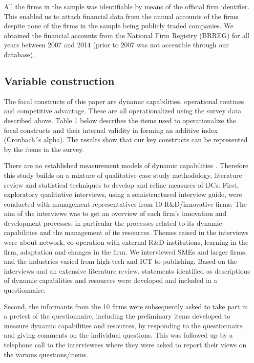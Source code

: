 \documentclass[review,fleqn]{elsarticle}\usepackage[]{graphicx}\usepackage[]{color}
\begin{document}
All the firms in the sample was identifiable by means of the official firm
identifier. This enabled us to attach financial data from the annual accounts of the firms
despite none of the firms in the sample being publicly traded companies. We obtained the
financial accounts from the National Firm Registry (BRREG) for all years between 2007 and
2014 (prior to 2007 was not accessible through our database).

\subsection{Variable construction}

The focal constructs of this paper are dynamic capabilities, operational routines and
competitive advantage. These are all operationalized using the survey data described
above. Table 1 below describes the items used to operationalize the focal constructs and
their internal validity in forming an additive index (Cronbach´s alpha). The results show
that our key constructs can be represented by the items in the survey.


There are no established measurement models of dynamic capabilities
\citep{McKelvie2009,Schilke2018}. Therefore this study builds on a mixture of qualitative
case study methodology, literature review and statistical techniques to develop and refine
measures of DCs. First, exploratory qualitative interviews, using a semistructured
interview guide, were conducted with management representatives from 10 R\&D/innovative
firms. The aim of the interviews was to get an overview of each firm's innovation and
development processes, in particular the processes related to its dynamic capabilities and
the management of its resources. Themes raised in the interviews were about network,
co-operation with external R\&D-institutions, learning in the firm, adaptation and changes
in the firm. We interviewed SMEs and larger firms, and the industries varied from
high-tech and ICT to publishing.  Based on the interviews and an extensive literature
review, statements identified as descriptions of dynamic capabilities and resources were
developed and included in a questionnaire.

Second, the informants from the 10 firms were subsequently asked to take part in a pretest
of the questionnaire, including the preliminary items developed to measure dynamic
capabilities and resources, by responding to the questionnaire and giving comments on the
individual questions. This was followed up by a telephone call to the interviewees where
they were asked to report their views on the various questions/items.
\end{document}
